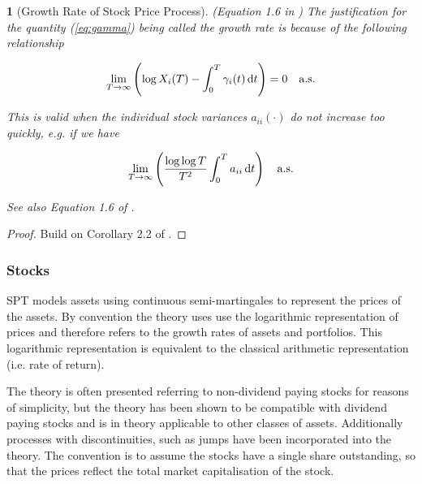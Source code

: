\documentclass[british]{amsart} \usepackage{lmodern}
\numberwithin{equation}{section} \numberwithin{figure}{section}
\theoremstyle{plain} \newtheorem{thm}{\protect\theoremname}[section]
\theoremstyle{definition} \newtheorem{defn}[thm]{\protect\definitionname}
\theoremstyle{plain} \newtheorem{assumption}[thm]{\protect\assumptionname}
\theoremstyle{plain} \newtheorem{lem}[thm]{\protect\lemmaname}
\theoremstyle{plain} \newtheorem{prop}[thm]{\protect\propositionname}
\theoremstyle{remark} \newtheorem{rem}[thm]{\protect\remarkname}
\theoremstyle{plain} \newtheorem{cor}[thm]{\protect\corollaryname}
\renewcommand{\d}[1]{\mathop{\mathrm{d}{#1}}}
\begin{document}
\begin{thm} [Growth Rate of Stock Price Process]
  \label{thm:growthrate}
  (Equation 1.6 in \cite{fernholz2009})
  The justification for the quantity (\ref{eq:gamma}) being called the 
  \textit{growth rate} is because of the following relationship

  \begin{equation}
    \lim_{T \to \infty} 
      \left( 
      \log{X_{i}(T)} - \int_{0}^{T} \gamma_{i}(t)\d{t} 
      \right) = 0
    \quad \almostsurely
  \end{equation}

  This is valid when the individual stock variances $a_{ii}(\cdot)$ do not
  increase too quickly, e.g. if we have 

  \begin{equation*}
    \lim_{T\to\infty} \left( \frac{\log \log T}{T^2} \int_{0}^{T} a_{ii} \d{t} \right)
    \quad \almostsurely 
  \end{equation*}

  See also Equation 1.6 of \cite{fernholz2009}.

\end{thm}

\begin{proof}
  Build on Corollary 2.2 of \cite{fernholz1999pgf}.
\end{proof}



\subsubsection{Stocks}

SPT models assets using continuous semi-martingales to represent the prices of
the assets. By convention the theory uses use the logarithmic representation of
prices and therefore refers to the growth rates of assets and portfolios. This
logarithmic representation is equivalent to the classical arithmetic
representation (i.e. rate of return).

The theory is often presented referring to non-dividend paying stocks for
reasons of simplicity, but the theory has been shown to be compatible with
dividend paying stocks and is in theory applicable to other classes of assets.
Additionally processes with discontinuities, such as jumps have been
incorporated into the theory. The convention is to assume the stocks have a
single share outstanding, so that the prices reflect the total market
capitalisation of the stock.
\end{document}
